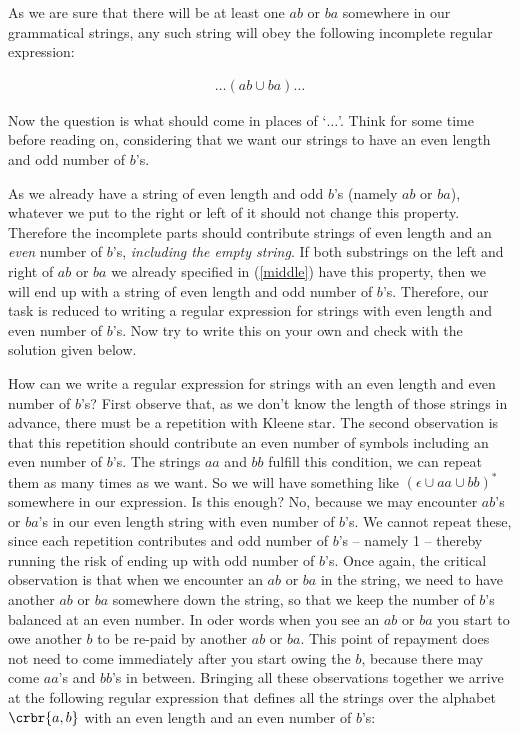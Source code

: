 \documentclass[11pt]{article}
\begin{document}
\begin{itemize}
\begin{enumerate}
As we are sure that there will be at least one $ab$ or $ba$ somewhere in our
grammatical strings, any such string will obey the following incomplete regular
expression:

\begin{align}\label{middle}
\ldots (ab \cup ba)\ldots
\end{align}



Now the question is what should come in places of `$\ldots$'. Think for some
time before reading on, considering that we want our strings to have an even
length and odd number of $b$'s.

As we already have a string of even length and odd $b$'s (namely $ab$ or $ba$),
whatever we put to the right or left of it should not change this property.
Therefore the incomplete parts should contribute strings of even length and an
\emph{even} number of $b$'s, \emph{including the empty string}. If both
substrings on the left and right of $ab$ or $ba$ we already specified in
(\ref{middle}) have this
property, then we will end up with a string of even length and odd number of
$b$'s. Therefore, our task is reduced to writing a regular expression for strings
with even length and even number of $b$'s. Now try to write this on your own and
check with the solution given below.

How can we write a regular expression for strings with an even length and even
number of $b$'s? First observe that, as we don't know the length of those
strings in advance, there must be a repetition with Kleene star. The second
observation is that this repetition should contribute an even number of symbols
including an even number of $b$'s. The strings $aa$ and $bb$ fulfill
this condition, we can repeat them as many times as we want. So we will have
something like $(\epsilon \cup aa \cup bb)^*$ somewhere in our expression. Is
this enough? No, because we may encounter $ab$'s or $ba$'s in our even length
string with even number of $b$'s. We cannot repeat these, since each repetition
contributes and odd number of $b$'s -- namely 1 -- thereby running the risk of
ending up with odd number of $b$'s. Once again, the critical observation is that
when we encounter an $ab$ or $ba$ in the string, we need to have another $ab$ or
$ba$ somewhere down the string, so that we keep the number of $b$'s balanced at
an even number. In oder words when you see an $ab$ or $ba$ you start to owe
another $b$ to be re-paid by another $ab$  or $ba$. This point of repayment does
not need to come immediately after you start owing the $b$, because there may
come $aa$'s and $bb$'s in between. Bringing all these observations together we
arrive at the following regular expression that defines all the strings over the
alphabet $\crbr{a,b}$ with an even length and an even number of $b$'s:


\end{enumerate}
\end{itemize}
\end{document}
